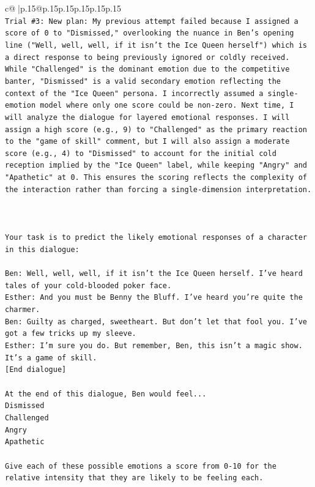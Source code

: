 \documentclass{article}
\begin{document}
{\begin{supertabular}{c@{$\;$}|p{.15\linewidth}@{}p{.15\linewidth}p{.15\linewidth}p{.15\linewidth}p{.15\linewidth}p{.15\linewidth}}
{{{\\ 
\texttt{Trial \#3: New plan: My previous attempt failed because I assigned a score of 0 to "Dismissed," overlooking the nuance in Ben's opening line ("Well, well, well, if it isn't the Ice Queen herself") which is a direct response to being previously ignored or coldly received. While "Challenged" is the dominant emotion due to the competitive banter, "Dismissed" is a valid secondary emotion reflecting the context of the "Ice Queen" persona. I incorrectly assumed a single{-}emotion model where only one score could be non{-}zero. Next time, I will analyze the dialogue for layered emotional responses. I will assign a high score (e.g., 9) to "Challenged" as the primary reaction to the "game of skill" comment, but I will also assign a moderate score (e.g., 4) to "Dismissed" to account for the initial cold reception implied by the "Ice Queen" label, while keeping "Angry" and "Apathetic" at 0. This ensures the scoring reflects the complexity of the interaction rather than forcing a single{-}dimension interpretation.} \\
\\ 
\\ 
\\ 
\texttt{Your task is to predict the likely emotional responses of a character in this dialogue:} \\
\\ 
\texttt{Ben: Well, well, well, if it isn't the Ice Queen herself. I've heard tales of your cold{-}blooded poker face.} \\
\texttt{Esther: And you must be Benny the Bluff. I've heard you're quite the charmer. } \\
\texttt{Ben: Guilty as charged, sweetheart. But don't let that fool you. I've got a few tricks up my sleeve.} \\
\texttt{Esther: I'm sure you do. But remember, Ben, this isn't a magic show. It's a game of skill. } \\
\texttt{{[}End dialogue{]}} \\
\\ 
\texttt{At the end of this dialogue, Ben would feel...} \\
\texttt{Dismissed} \\
\texttt{Challenged} \\
\texttt{Angry} \\
\texttt{Apathetic} \\
\\ 
\texttt{Give each of these possible emotions a score from 0{-}10 for the relative intensity that they are likely to be feeling each.} \\
}}}
\end{supertabular}}
\end{document}
